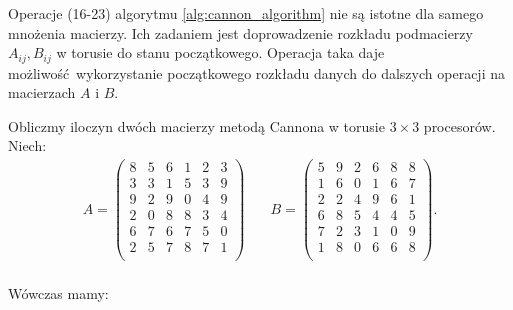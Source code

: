 Operacje (16-23) algorytmu \ref{alg:cannon_algorithm} nie są istotne dla samego mnożenia macierzy. Ich zadaniem jest doprowadzenie rozkładu podmacierzy \(A_{ij}, B_{ij}\) w torusie do stanu początkowego. Operacja taka daje możliwość wykorzystanie początkowego rozkładu danych do dalszych operacji na macierzach \(A\) i \(B\).

\begin{przyklad}
Obliczmy iloczyn dwóch macierzy metodą Cannona w torusie \(3\times 3\) procesorów. Niech:
\begin{align*}
A=
\begin{pmatrix}
        8 & 5 & 6 & 1 & 2 & 3 \\
        3 & 3 & 1 & 5 & 3 & 9 \\ 
        9 & 2 & 9 & 0 & 4 & 9 \\ 
        2 & 0 & 8 & 8 & 3 & 4 \\ 
        6 & 7 & 6 & 7 & 5 & 0 \\ 
        2 & 5 & 7 & 8 & 7 & 1 \\
\end{pmatrix} & \quad 
B=
\begin{pmatrix}
        5 & 9 & 2 & 6 & 8 & 8 \\
        1 & 6 & 0 & 1 & 6 & 7 \\ 
        2 & 2 & 4 & 9 & 6 & 1 \\ 
        6 & 8 & 5 & 4 & 4 & 5 \\ 
        7 & 2 & 3 & 1 & 0 & 9 \\ 
        1 & 8 & 0 & 6 & 6 & 8 \\
\end{pmatrix}.\\
\end{align*}

Wówczas mamy:








\end{przyklad}
